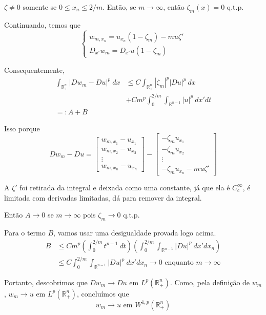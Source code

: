 \documentclass[11pt]{article}
\newcommand{\R}{\mathbb{R}}
\begin{document}
$ \zeta \neq 0  $ somente se $ 0 \leq x_n \leq 2/m $. Então, se $ m \rightarrow \infty $, então $\zeta_m(x) = 0 $ q.t.p.

Continuando, temos que \[ \begin{cases}
	w_{m,x_n}=u_{x_n}(1 - \zeta_m) - mu\zeta' \\
	D_{x'}w_m = D_{x'}u(1-\zeta_m)
\end{cases} \]

Consequentemente, \begin{align*}
	 \int_{\R^n_+} |Dw_m - Du|^p\ dx &\leq C \int_{\R^n_+} |\zeta_m|^p |Du|^p \ dx  \\
	  & +C m^p \int_0^{2/m} \int_{\R^{n-1}} |u|^p \ dx'dt \\
	 =: A + B
\end{align*}

Isso porque \[ Dw_m - Du = \begin{bmatrix}
	w_{m, x_1} - u_{x_1} \\
		w_{m, x_2} - u_{x_2} \\
	\vdots \\
	w_{m, x_n} - u_{x_n}
\end{bmatrix}  - \begin{bmatrix}
- \zeta_m u_{x_1} \\
-\zeta_m u_{x_2} \\
\vdots \\
-\zeta_m u_{x_n} - mu\zeta'
\end{bmatrix}\] 

A $ \zeta' $ foi retirada da integral e deixada como uma constante, já que ela é $C^\infty_c$, é limitada com derivadas limitadas, dá para remover da integral.


Então $A\rightarrow 0$ se $m\rightarrow \infty$ pois $\zeta_m \rightarrow 0$ q.t.p.

Para o termo $B$, vamos usar uma desigualdade provada logo acima. \begin{align*}
	B &\leq C m^p \left(\int_0^{2/m} t^{p-1}\ dt\right)\left(\int_0^{2/m} \int_{\R^{n-1}} |Du|^p \ dx' dx_n\right) \\
	&\leq C \int_0^{2/m} \int_{\R^{n-1}} |Du|^p \ dx'dx_n \rightarrow 0 \text{ enquanto } m \rightarrow \infty
\end{align*}

Portanto, descobrimos que $ Dw_m \rightarrow Du \text{ em } L^{p}(\R^n_+)$. Como, pela definição de $w_m$, $w_m\rightarrow u$ em $ L^p(\R^n_+)$, concluímos que \[ w_m \rightarrow u \text{ em } W^{1,p}(\R^n_+) \]
\end{document}
